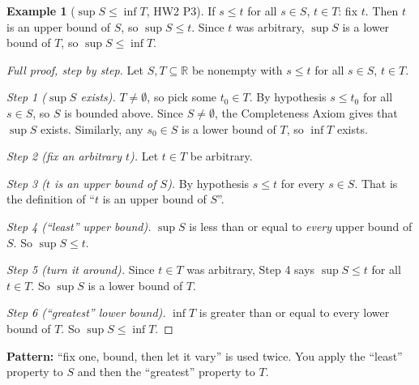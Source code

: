 \documentclass[11pt]{article}
\theoremstyle{definition}
\newtheorem{ex}[defn]{Example}
\newcommand{\R}{\mathbb{R}}
\newcommand{\key}[1]{\textcolor{red!70!black}{\textbf{#1}}}
\begin{document}
\begin{ex}[$\sup S\le\inf T$, HW2 P3]
If $s\le t$ for all $s\in S$, $t\in T$: fix $t$. Then $t$ is an upper bound
of $S$, so $\sup S\le t$. Since $t$ was arbitrary, $\sup S$ is a lower
bound of $T$, so $\sup S\le\inf T$.

\begin{proof}[Full proof, step by step]
Let $S,T\subseteq\R$ be nonempty with $s\le t$ for all $s\in S$, $t\in T$.

\emph{Step 1 ($\sup S$ exists).} $T\ne\emptyset$, so pick some $t_0\in T$.
By hypothesis $s\le t_0$ for all $s\in S$, so $S$ is bounded above. Since
$S\ne\emptyset$, the Completeness Axiom gives that $\sup S$ exists.
Similarly, any $s_0\in S$ is a lower bound of $T$, so $\inf T$ exists.

\emph{Step 2 (fix an arbitrary $t$).} Let $t\in T$ be arbitrary.

\emph{Step 3 ($t$ is an upper bound of $S$).} By hypothesis $s\le t$ for
every $s\in S$. That is the definition of ``$t$ is an upper bound of $S$''.

\emph{Step 4 (``least'' upper bound).} $\sup S$ is less than or equal to
\emph{every} upper bound of $S$. So $\sup S\le t$.

\emph{Step 5 (turn it around).} Since $t\in T$ was arbitrary, Step 4 says
$\sup S\le t$ for all $t\in T$. So $\sup S$ is a lower bound of $T$.

\emph{Step 6 (``greatest'' lower bound).} $\inf T$ is greater than or
equal to every lower bound of $T$. So $\sup S\le\inf T$.
\end{proof}
\noindent\key{Pattern:} ``fix one, bound, then let it vary'' is used
twice. You apply the ``least'' property to $S$ and then the ``greatest''
property to $T$.
\end{ex}
\end{document}
